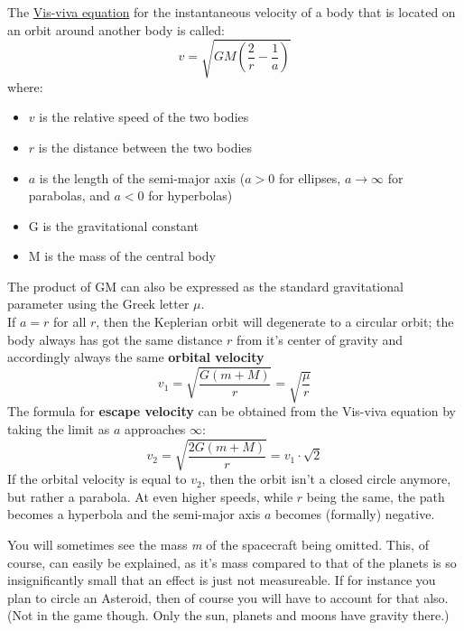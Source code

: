 \documentclass[12pt,paper=A4,numbers=noenddot,bibliography=totoc,listof=totoc,DIV=11,BCOR=1mm]{scrreprt}
\begin{document}
\medskip
The \href{https://en.wikipedia.org/wiki/vis-viva_equation}{Vis-viva equation} for the \hypertarget{velocityatorbitposition}{instantaneous velocity of a body} that is located on an orbit around another body is called:
\begin{equation}
v = \sqrt{GM \left( \frac{2}{r} - \frac{1}{a} \right) }
\end{equation}
where:
\begin{itemize}
\item $v$ is the relative speed of the two bodies
\item $r$ is the distance between the two bodies
\item $a$ is the length of the semi-major axis ($a > 0$ for ellipses, $a \rightarrow \infty$ for parabolas, and $a < 0$ for hyperbolas)
\item G is the gravitational constant
\item M is the mass of the central body
\end{itemize}
The product of GM can also be expressed as the standard gravitational parameter using the Greek letter $\mu$.\\
If $a = r$ for all $r$, then the Keplerian orbit will degenerate to a circular orbit; the body always has got the same distance $r$ from it's center of gravity and accordingly always the same \textbf{orbital velocity}
\begin{equation}
v_{1} = \sqrt{\frac{G(m+M)}{r}} = \sqrt{\frac{\mu}{r}}
\end{equation}
The formula for \textbf{escape velocity} can be obtained from the Vis-viva equation by taking the limit as $a$ approaches $\infty$:
\begin{equation}
v_{2} = \sqrt{\frac{2G(m+M)}{r}} = v_{1}\cdot\sqrt{2}
\end{equation}
If the orbital velocity is equal to $v_{2}$, then the orbit isn't a closed circle anymore, but rather a parabola. At even higher speeds, while $r$ being the same, the path becomes a hyperbola and the semi-major axis $a$ becomes (formally) negative.

You will sometimes see the mass \textit{m} of the spacecraft being omitted. This, of course, can easily be explained, as it's mass compared to that of the planets is so insignificantly small that an effect is just not measureable. If for instance you plan to circle an Asteroid, then of course you will have to account for that also. (Not in the game though. Only the sun, planets and moons have gravity there.)
\end{document}
